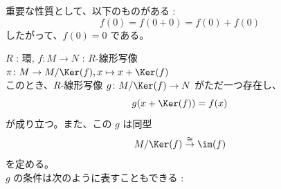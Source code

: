 \documentclass[article,paper=a4paper]{jlreq}
\begin{document}
\begin{rem}
  重要な性質として、以下のものがある :
  \[f(0) = f(0+0) = f(0) + f(0)\]
  したがって、$f(0) = 0$ である。
\end{rem}

\begin{thm}
  \quad $R$ : 環, $f \colon M \to N$ : $R$-\hspace{0pt}線形写像\\
  \quad $\pi \colon M \to M/\Ker(f), x \mapsto x + \Ker(f)$ \\
  このとき、$R$-\hspace{0pt}線形写像 $g \colon M/\Ker(f) \to N$ がただ一つ存在し、
  \[g(x + \Ker(f)) = f(x)\]
  が成り立つ。また、この $g$ は同型
  \[M/\Ker(f) \overset{\cong}{\to} \im(f)\]
  を定める。\\
  $g$ の条件は次のように表すこともできる :\\
  \begin{center}
  \end{center}
\end{thm}
\end{document}
